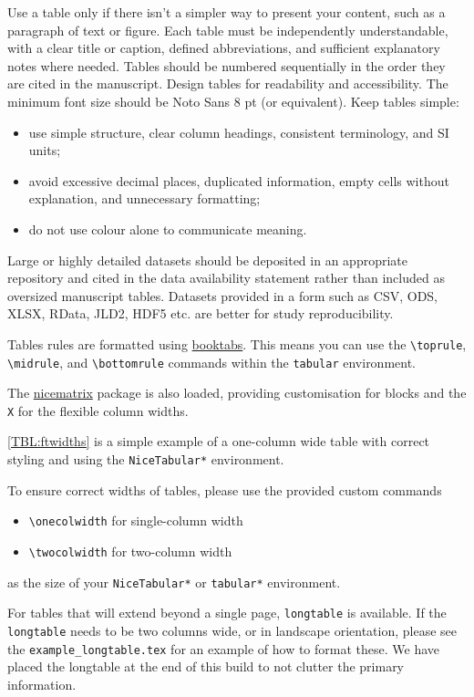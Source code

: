 \documentclass[submission, anonymous]{sedimentologika}
\begin{document}
Use a table only if there isn’t a simpler way to present your content, such as a paragraph of text or figure.
Each table must be independently understandable, with a clear title or caption, defined abbreviations, and sufficient explanatory notes where needed.
Tables should be numbered sequentially in the order they are cited in the manuscript.
Design tables for readability and accessibility.
The minimum font size should be Noto Sans 8 pt (or equivalent).
Keep tables simple:
\begin{itemize}
  \item use simple structure, clear column headings, consistent terminology, and SI units;
  \item avoid excessive decimal places, duplicated information, empty cells without explanation, and unnecessary formatting;
  \item do not use colour alone to communicate meaning.
\end{itemize}

Large or highly detailed datasets should be deposited in an appropriate repository and cited in the data availability statement rather than included as oversized manuscript tables.
Datasets provided in a form such as CSV, ODS, XLSX, RData, JLD2, HDF5 etc. are better for study reproducibility.

Tables rules are formatted using \href{http://mirrors.ctan.org/macros/latex/contrib/booktabs/booktabs.pdf}{booktabs}.
This means you can use the \verb|\toprule|, \verb|\midrule|, and \verb|\bottomrule| commands within the \verb|tabular| environment.

The \href{http://mirrors.ctan.org/macros/latex/contrib/nicematrix/nicematrix.pdf}{nicematrix} package is also loaded, providing customisation for blocks and the \verb|X| for the flexible column widths.

\autoref{TBL:ftwidths} is a simple example of a one-column wide table with correct styling and using the \verb|NiceTabular*| environment.

To ensure correct widths of tables, please use the provided custom commands
\begin{itemize}
    \item \verb|\onecolwidth| for single-column width
    \item \verb|\twocolwidth| for two-column width
\end{itemize}
as the size of your \verb|NiceTabular*| or \verb|tabular*| environment.

For tables that will extend beyond a single page, \verb|longtable| is available.
If the \verb|longtable| needs to be two columns wide, or in landscape orientation, please see the \verb|example_longtable.tex| for an example of how to format these.
We have placed the longtable at the end of this build to not clutter the primary information.
\end{document}
